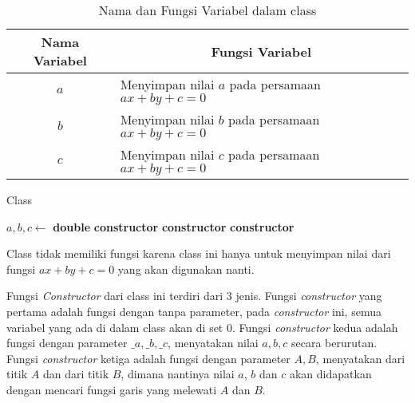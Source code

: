 \begin{table}[]
	\Centering
	\begin{tabular}{|c|p{7cm}|}
	\hline
	Nama Variabel & \multicolumn{1}{c|}{Fungsi Variabel}                               \\ \hline
$a$           & Menyimpan nilai $a$ pada persamaan $ax + by + c =0$ \\ \hline
$b$           & Menyimpan nilai $b$ pada persamaan $ax + by + c =0$          \\ \hline
$c$           & Menyimpan nilai $c$ pada persamaan $ax + by + c =0$          \\ \hline
	\end{tabular}
	\caption{Nama dan Fungsi Variabel dalam class }
	\label{tab:var-line}
\end{table}
\begin{algorithm}
	\caption{Class }
	\label{psdo:class-line}
	\begin{algorithmic}[1]
        \State $ a, b, c \leftarrow $ \textbf{double}
		\State \textbf{constructor} 
        \State \textbf{constructor} 
        \State \textbf{constructor} 
	\end{algorithmic}
\end{algorithm}

Class  tidak memiliki fungsi karena class ini hanya untuk menyimpan nilai dari fungsi $ax+by+c=0$ yang akan digunakan nanti.

Fungsi \textit{Constructor} dari class ini terdiri dari 3 jenis. Fungsi \textit{constructor} yang pertama adalah fungsi dengan tanpa parameter, pada \textit{constructor} ini, semua variabel yang ada di dalam class  akan di set $0$. Fungsi \textit{constructor} kedua adalah fungsi dengan parameter $\_a, \_b, \_c$, menyatakan nilai $a, b, c$ secara berurutan. Fungsi \textit{constructor} ketiga adalah fungsi dengan parameter $A, B$, menyatakan  dari titik $A$ dan  dari titik $B$, dimana nantinya nilai $a$, $b$ dan $c$ akan didapatkan dengan mencari fungsi garis yang melewati  $A$ dan  $B$.